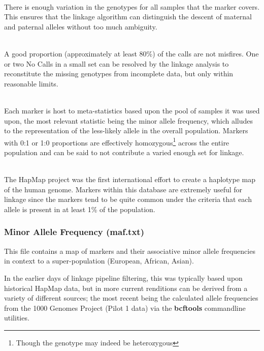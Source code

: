 \begin{description}[labelsep=4em, align=left, labelwidth=4em, labelindent=2em, leftmargin=*]

\item[Varied Set]{\hfill \\There is enough variation in the genotypes for all samples that the marker covers. This ensures that the linkage algorithm can distinguish the descent of maternal and paternal alleles without too much ambiguity.}

\item[High Quality]{\hfill \\A good proportion (approximately at least 80\%) of the calls are not misfires. One or two No Calls in a small set can be resolved by the linkage analysis to reconstitute the missing genotypes from incomplete data, but only within reasonable limits.}

\item[Non-Zero Allele Frequencies (optional]{\hfill \\Each marker is host to meta-statistics based upon the pool of samples it was used upon, the most relevant statistic being the minor allele frequency, which alludes to the representation of the less-likely allele in the overall population. Markers with 0:1 or 1:0 proportions are effectively homozygous\footnote{Though the genotype may indeed be heterozygous} across the entire population and can be said to not contribute a varied enough set for linkage.}

\item[Known Inheritance Pattern (optional)]{\hfill \\The HapMap project was the first international effort to create a haplotype map of the human genome. Markers within this database are extremely useful for linkage since the markers tend to be quite common under the criteria that each allele is present in at least 1\% of the population.}
\end{description}


\subsubsection{Minor Allele Frequency (maf.txt)}

This file contains a map of markers and their associative minor allele frequencies in context to a super-population (European, African, Asian). 

In the earlier days of linkage pipeline filtering, this was typically based upon historical HapMap data, but in more current renditions can be derived from a variety of different sources; the most recent being the calculated allele frequencies from the 1000 Genomes Project (Pilot 1 data) via the \textbf{bcftools} commandline utilities.

